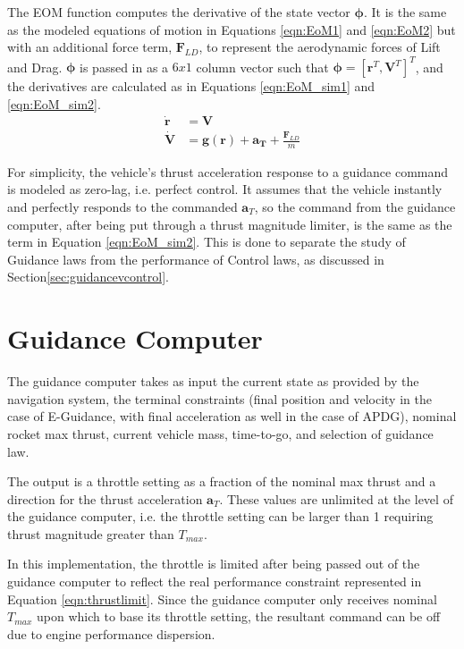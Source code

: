 The EOM function computes the derivative of the state vector $\bm{\phi}$. It is the same as the modeled equations of motion in Equations \ref{eqn:EoM1} and \ref{eqn:EoM2} but with an additional force term, $\bm{F}_{LD}$, to represent the aerodynamic forces of Lift and Drag. $\bm{\phi}$ is passed in as a $6x1$ column vector such that $\bm{\phi} = [\bm{r}^T,\bm{V}^T]^T$, and the derivatives are calculated as in Equations \ref{eqn:EoM_sim1} and \ref{eqn:EoM_sim2}.
\begin{align}
\label{eqn:EoM_sim1}
\bm{\dot{r}} &= \bm{V}\\
\label{eqn:EoM_sim2}
\bm{\dot{V}} &= \bm{g(r)} + \bm{a_T} + \frac{\bm{F}_{LD}}{m}
\end{align}

For simplicity, the vehicle's thrust acceleration response to a guidance command is modeled as zero-lag, i.e. perfect control. It assumes that the vehicle instantly and perfectly responds to the commanded $\bm{a}_T$, so the command from the guidance computer, after being put through a thrust magnitude limiter, is the same as the term in Equation \ref{eqn:EoM_sim2}. This is done to separate the study of Guidance laws from the performance of Control laws, as discussed in Section\:\ref{sec:guidancevcontrol}.

\section{Guidance Computer} \label{sec:guidancecomp}
The guidance computer takes as input the current state as provided by the navigation system, the terminal constraints (final position and velocity in the case of E-Guidance, with final acceleration as well in the case of APDG), nominal rocket max thrust, current vehicle mass, time-to-go, and selection of guidance law.

The output is a throttle setting as a fraction of the nominal max thrust and a direction for the thrust acceleration $\bm{a}_T$. These values are unlimited at the level of the guidance computer, i.e. the throttle setting can be larger than 1 requiring thrust magnitude greater than $T_{max}$. 

In this implementation, the throttle is limited after being passed out of the guidance computer to reflect the real performance constraint represented in Equation \ref{eqn:thrustlimit}. Since the guidance computer only receives nominal $T_{max}$ upon which to base its throttle setting, the resultant command can be off due to engine performance dispersion.

